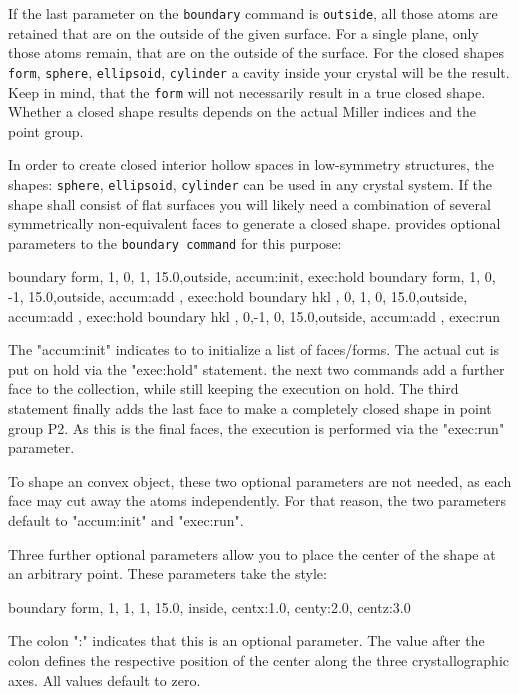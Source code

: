 If the last parameter on the {\tt boundary} command is {\tt outside},
all those atoms are retained that are on the outside of the given
surface. For a single plane, only those atoms remain, that are on the 
outside of the surface. For the closed shapes {\tt form}, 
{\tt sphere}, {\tt ellipsoid}, {\tt cylinder} a cavity inside your
crystal will be the result. Keep in mind, that the {\tt form} will
not necessarily result in a true closed shape. Whether a closed
shape results depends on the actual Miller indices and the point 
group.


In order to create closed interior hollow spaces in low-symmetry 
structures, the shapes: {\tt sphere}, {\tt ellipsoid}, {\tt cylinder}
can be used in any crystal system. If the shape shall consist 
of flat surfaces you will likely need a combination of several
symmetrically non-equivalent faces to generate a closed shape.
\Discus provides optional parameters to the {\tt boundary command}
 for this  purpose:

\begin{MacVerbatim}
boundary  form, 1, 0,  1, 15.0,outside, accum:init, exec:hold
boundary  form, 1, 0, -1, 15.0,outside, accum:add , exec:hold
boundary  hkl , 0, 1,  0, 15.0,outside, accum:add , exec:hold
boundary  hkl , 0,-1,  0, 15.0,outside, accum:add , exec:run
\end{MacVerbatim}

The "accum:init" indicates to \Discus to initialize a list of
faces/forms. The actual cut is put on hold via the 
"exec:hold" statement. the next two commands add a further face
to the collection, while still keeping the execution on hold. 
The third statement finally adds the last face to make a 
completely closed shape in point group P2. As this is the final 
faces, the execution is performed via the "exec:run" parameter.

To shape an convex object, these two optional parameters are 
not needed, as each face may cut away the atoms independently.
For that reason, the two parameters default to
"accum:init" and "exec:run". 

Three further optional parameters allow you to place the center of the 
shape at an arbitrary point. These parameters take the style:

\begin{MacVerbatim}
boundary form, 1, 1,  1, 15.0, inside, centx:1.0, centy:2.0, centz:3.0
\end{MacVerbatim}

The colon ":" indicates that this is an optional parameter. The
value after the colon defines the respective position of the 
center along the three crystallographic axes. All values default
to zero.


